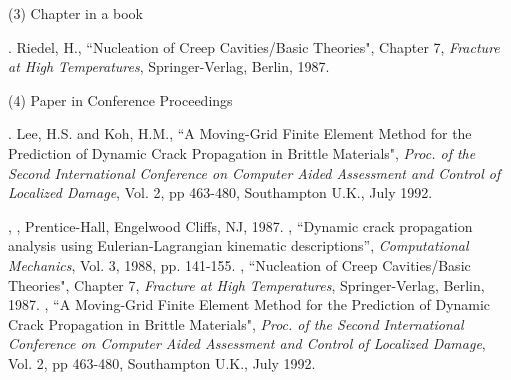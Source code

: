 \documentclass[12pt]{ksiamproc}
\begin{document}
	\bigskip
	\noindent (3) Chapter in a book
	
	.  Riedel, H., ``Nucleation of Creep Cavities/Basic
	Theories", Chapter 7, {\it Fracture at High Temperatures},
	Springer-Verlag, Berlin, 1987.
	
	\bigskip
	\noindent (4) Paper in Conference Proceedings
	
	.  Lee, H.S. and Koh, H.M., ``A Moving-Grid Finite
	Element Method for the Prediction of Dynamic Crack Propagation in
	Brittle Materials", {\it Proc. of the Second International
		Conference on Computer Aided Assessment and Control of Localized
		Damage}, Vol. 2, pp 463-480, Southampton U.K., July 1992.
	
	\begin{thebibliography}{11}
		,
		, Prentice-Hall, Engelwood Cliffs, NJ, 1987.
		,
		{``Dynamic crack propagation analysis using Eulerian-Lagrangian
			kinematic descriptions''}, {\em Computational Mechanics}, Vol. 3,
		1988, pp. 141-155.
		,
		{``Nucleation of Creep Cavities/Basic Theories"},  Chapter 7, {\it
			Fracture at High Temperatures}, Springer-Verlag, Berlin, 1987.
		,
		{``A Moving-Grid Finite Element Method for the Prediction of
			Dynamic Crack Propagation in Brittle Materials"}, {\it Proc. of
			the Second International Conference on Computer Aided Assessment
			and Control of Localized Damage}, Vol. 2, pp 463-480, Southampton
		U.K., July 1992.
	\end{thebibliography}
\end{document}
